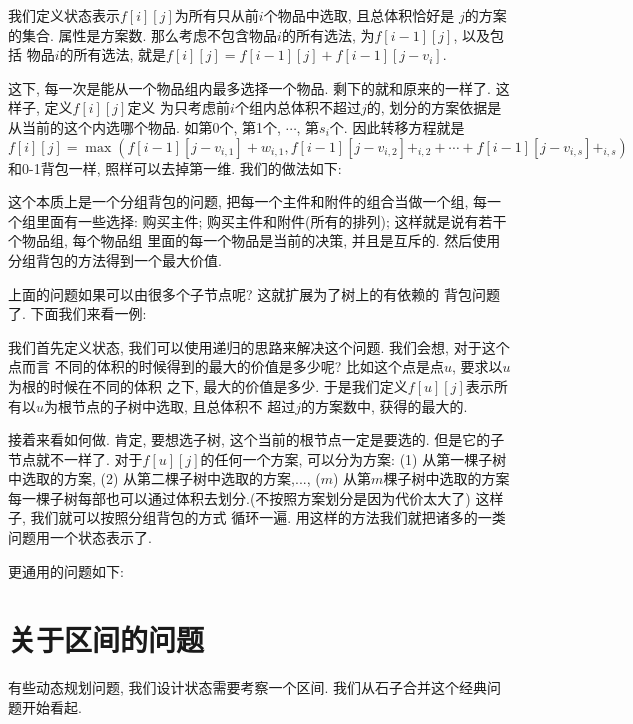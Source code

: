  
我们定义状态表示$f[i][j]$为所有只从前$i$个物品中选取, 且总体积恰好是
$j$的方案的集合. 属性是方案数. 那么考虑不包含物品$i$的所有选法, 为$f[i-1][j]$, 以及包括
物品$i$的所有选法, 就是$f[i][j] = f[i-1][j]+f[i-1][j-v_i]$. 

 

这下, 每一次是能从一个物品组内最多选择一个物品. 剩下的就和原来的一样了. 这样子, 定义$f[i][j]$定义
为只考虑前$i$个组内总体积不超过$j$的, 划分的方案依据是从当前的这个内选哪个物品. 如第0个, 第1个,
$\cdots$, 第$s_i$个. 因此转移方程就是
$$
f[i][j] = \max(f[i-1][j-v_{i,1}]+w_{i,1}, f[i-1][j-v_{i,2}]+_{i,2}+\cdots + f[i-1][j-v_{i,s}]+_{i,s})
$$
和0-1背包一样, 照样可以去掉第一维. 我们的做法如下: 

 这个本质上是一个分组背包的问题, 把每一个主件和附件的组合当做一个组, 
每一个组里面有一些选择: 购买主件; 购买主件和附件(所有的排列); 这样就是说有若干个物品组, 每个物品组
里面的每一个物品是当前的决策, 并且是互斥的. 然后使用分组背包的方法得到一个最大价值.  

 上面的问题如果可以由很多个子节点呢? 这就扩展为了树上的有依赖的
背包问题了. 下面我们来看一例: 

 我们首先定义状态, 我们可以使用递归的思路来解决这个问题. 我们会想, 对于这个点而言
不同的体积的时候得到的最大的价值是多少呢? 比如这个点是点$u$, 要求以$u$为根的时候在不同的体积
之下, 最大的价值是多少. 于是我们定义$f[u][j]$表示所有以$u$为根节点的子树中选取, 且总体积不
超过$j$的方案数中, 获得的最大的. 

接着来看如何做. 肯定, 要想选子树, 这个当前的根节点一定是要选的. 但是它的子节点就不一样了. 
对于$f[u][j]$的任何一个方案, 可以分为方案: (1) 从第一棵子树中选取的方案, (2) 从第二棵子树中选取的方案,...,
($m$) 从第$m$棵子树中选取的方案
每一棵子树每部也可以通过体积去划分.(不按照方案划分是因为代价太大了) 这样子, 我们就可以按照分组背包的方式
循环一遍. 用这样的方法我们就把诸多的一类问题用一个状态表示了. 

更通用的问题如下: 




\section{关于区间的问题}

有些动态规划问题, 我们设计状态需要考察一个区间. 我们从石子合并这个经典问题开始看起. 

